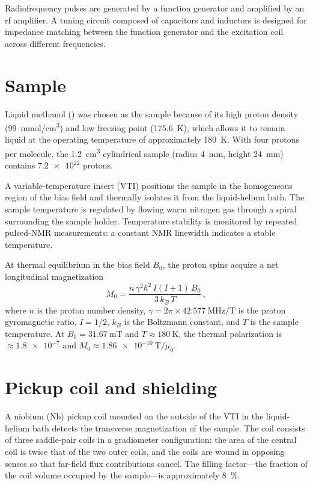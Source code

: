 Radiofrequency pulses are generated by a function generator and amplified by an rf amplifier.
A tuning circuit composed of capacitors and inductors is designed for impedance matching between the function generator and the excitation coil across different frequencies.

\section{Sample}\label{sec:apparatus:sample}

Liquid methanol () was chosen as the sample because of its high proton density (\SI{99}{\mmol/\cm^3}) and low freezing point (\SI{175.6}{\kelvin}), which allows it to remain liquid at the operating temperature of approximately \SI{180}{\kelvin}.
With four protons per molecule, the \SI{1.2}{\cm^3} cylindrical sample (radius \SI{4}{\mm}, height \SI{24}{\mm}) contains $\num{7.2e22}$ protons.

A variable-temperature insert (VTI) positions the sample in the homogeneous region of the bias field and thermally isolates it from the liquid-helium bath.
The sample temperature is regulated by flowing warm nitrogen gas through a spiral surrounding the sample holder.
Temperature stability is monitored by repeated pulsed-NMR measurements: a constant NMR linewidth indicates a stable temperature.

At thermal equilibrium in the bias field $B_0$, the proton spins acquire a net longitudinal magnetization
\begin{equation}
    M_0 = \frac{n\,\gamma^2\hbar^2\,I(I+1)\,B_0}{3\,k_B\,T}
    \,,\label{eq:M0}
\end{equation}
where $n$ is the proton number density, $\gamma = 2\pi\times\SI{42.577}{\MHz/\tesla}$ is the proton gyromagnetic ratio, $I=1/2$, $k_B$ is the Boltzmann constant, and $T$ is the sample temperature.
At $B_0 = \SI{31.67}{\milli\tesla}$ and $T \approx \SI{180}{\kelvin}$, the thermal polarization is $\approx\num{1.8e-7}$ and $M_0 \approx \SI{1.86e-10}{\tesla}/\mu_0$.


\section{Pickup coil and shielding}\label{sec:apparatus:pickup}

A niobium (Nb) pickup coil mounted on the outside of the VTI in the liquid-helium bath detects the transverse magnetization of the sample.
The coil consists of three saddle-pair coils in a gradiometer configuration: the area of the central coil is twice that of the two outer coils, and the coils are wound in opposing senses so that far-field flux contributions cancel.
The filling factor---the fraction of the coil volume occupied by the sample---is approximately \SI{8}{\%}.

